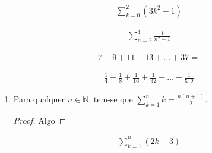 

\begin{align*}
	\sum^2_{k = 0} (3k^2 -1)
\end{align*}



\begin{align*}
	\sum_{n=2}^{4} \frac{1}{n^2 - 1}
\end{align*}



\begin{align*}
	7 + 9 + 11 + 13 + \ldots + 37 = 
\end{align*}


\begin{align*}
	\frac{1}{4} + \frac{1}{8} + \frac{1}{16} + \frac{1}{32} + \ldots +
	\frac{1}{512}
\end{align*}



\begin{enumerate}
	\item
		\begin{proposition}
			Para qualquer $n \in \mathbb{N}$, tem-se que
			$\sum_{k=1}^{n} k = \frac{n(n+1)}{2}$.
		\end{proposition}
		\begin{proof}
			Algo
		\end{proof}
\end{enumerate}


\begin{align*}
	\sum_{k=1}^{n} (2k+3)
\end{align*}

